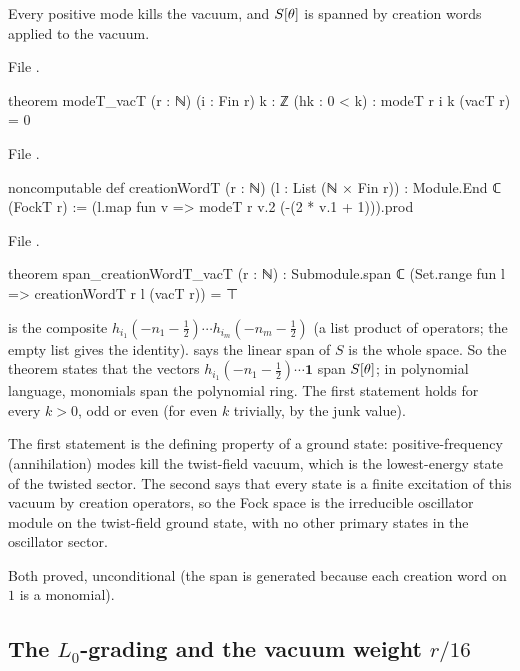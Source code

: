 \begin{proposition}\label{ch06:prop:vacT}
Every positive mode kills the vacuum, and $S[\theta]$ is spanned by creation words applied to the
vacuum.
\end{proposition}
\noindent File .
\begin{leancode}
theorem modeT_vacT (r : ℕ) (i : Fin r) {k : ℤ} (hk : 0 < k) : modeT r i k (vacT r) = 0
\end{leancode}
\noindent File .
\begin{leancode}
noncomputable def creationWordT (r : ℕ) (l : List (ℕ × Fin r)) : Module.End ℂ (FockT r) :=
  (l.map fun v => modeT r v.2 (-(2 * v.1 + 1))).prod
\end{leancode}
\noindent File .
\begin{leancode}
theorem span_creationWordT_vacT (r : ℕ) :
    Submodule.span ℂ (Set.range fun l => creationWordT r l (vacT r)) = ⊤
\end{leancode}
\begin{dictionary}
 is the composite
$h_{i_1}(-n_1-\frac12)\cdots h_{i_m}(-n_m-\frac12)$ (a list product of operators; the empty
list gives the identity).   says the linear span of $S$ is the whole
space.  So the theorem states that the vectors $h_{i_1}(-n_1-\frac12)\cdots\mathbf 1$ span
$S[\theta]$; in polynomial language, monomials span the polynomial ring.  The first statement holds
for every $k>0$, odd or even (for even $k$ trivially, by the junk value).
\end{dictionary}

\begin{physics}
The first statement is the defining property of a ground state: positive-frequency (annihilation) modes kill the twist-field vacuum, which is the lowest-energy state of the twisted sector. The second says that every state is a finite excitation of this vacuum by creation operators, so the Fock space is the irreducible oscillator module on the twist-field ground state, with no other primary states in the oscillator sector.
\end{physics}
\begin{status}
Both proved, unconditional (the span is generated because each creation word on $1$ is a monomial).
\end{status}

\subsection{The \texorpdfstring{$L_0$}{L0}-grading and the vacuum weight \texorpdfstring{$r/16$}{r/16}}

